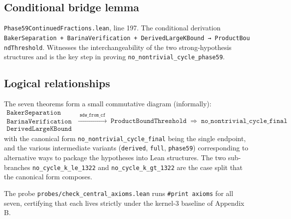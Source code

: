 \documentclass[
  11pt]{amsart}
\providecommand{\tightlist}{%
  \setlength{\itemsep}{0pt}\setlength{\parskip}{0pt}}
\theoremstyle{plain}
\theoremstyle{definition}
\theoremstyle{remark}
\begin{document}
\subsection{Conditional bridge lemma}\label{conditional-bridge-lemma}

\begin{description}
\tightlist
\item[\texttt{ProjetCollatz.sdw\_from\_cf}]
\texttt{Phase59ContinuedFractions.lean}, line 197. The conditional
derivation
\texttt{BakerSeparation\ +\ BarinaVerification\ +\ DerivedLargeKBound\ →\ ProductBoundThreshold}.
Witnesses the interchangeability of the two strong-hypothesis structures
and is the key step in proving \texttt{no\_nontrivial\_cycle\_phase59}.
\end{description}

\subsection{Logical relationships}\label{logical-relationships}

The seven theorems form a small commutative diagram (informally): \[
\begin{array}{c}
\mathtt{BakerSeparation} \\
\mathtt{BarinaVerification} \\
\mathtt{DerivedLargeKBound}
\end{array}
\;\xrightarrow{\;\mathtt{sdw\_from\_cf}\;}\;
\mathtt{ProductBoundThreshold}
\;\Rightarrow\;
\mathtt{no\_nontrivial\_cycle\_final}
\] with the canonical form \texttt{no\_nontrivial\_cycle\_final} being
the single endpoint, and the various intermediate variants
(\texttt{derived}, \texttt{full}, \texttt{phase59}) corresponding to
alternative ways to package the hypotheses into Lean structures. The two
sub-branches \texttt{no\_cycle\_k\_le\_1322} and
\texttt{no\_cycle\_k\_gt\_1322} are the case split that the canonical
form composes.

The probe \texttt{probes/check\_central\_axioms.lean} runs
\texttt{\#print\ axioms} for all seven, certifying that each lives
strictly under the kernel-3 baseline of Appendix B.
\end{document}
